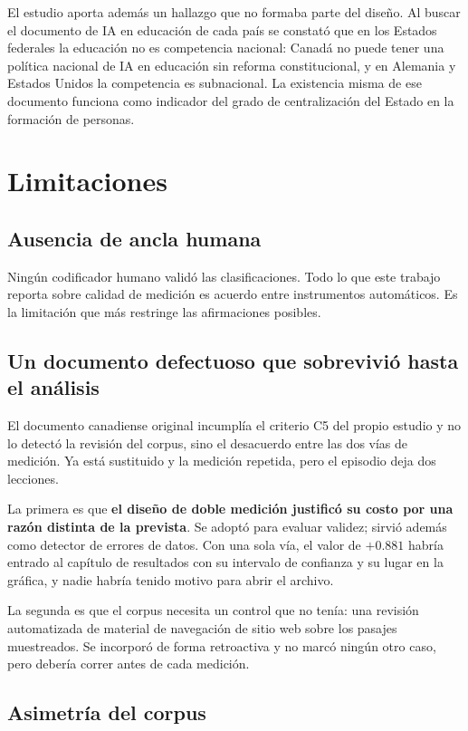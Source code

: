 El estudio aporta además un hallazgo que no formaba parte del diseño. Al buscar el documento de IA en educación de cada país se constató que en los Estados federales la educación no es competencia nacional: Canadá no puede tener una política nacional de IA en educación sin reforma constitucional, y en Alemania y Estados Unidos la competencia es subnacional. La existencia misma de ese documento funciona como indicador del grado de centralización del Estado en la formación de personas.

\section{Limitaciones}

\subsection{Ausencia de ancla humana}

Ningún codificador humano validó las clasificaciones. Todo lo que este trabajo reporta sobre calidad de medición es acuerdo entre instrumentos automáticos. Es la limitación que más restringe las afirmaciones posibles.

\subsection{Un documento defectuoso que sobrevivió hasta el análisis}

El documento canadiense original incumplía el criterio C5 del propio estudio y no lo detectó la revisión del corpus, sino el desacuerdo entre las dos vías de medición. Ya está sustituido y la medición repetida, pero el episodio deja dos lecciones.

La primera es que \textbf{el diseño de doble medición justificó su costo por una razón distinta de la prevista}. Se adoptó para evaluar validez; sirvió además como detector de errores de datos. Con una sola vía, el valor de $+0.881$ habría entrado al capítulo de resultados con su intervalo de confianza y su lugar en la gráfica, y nadie habría tenido motivo para abrir el archivo.

La segunda es que el corpus necesita un control que no tenía: una revisión automatizada de material de navegación de sitio web sobre los pasajes muestreados. Se incorporó de forma retroactiva y no marcó ningún otro caso, pero debería correr antes de cada medición.

\subsection{Asimetría del corpus}

